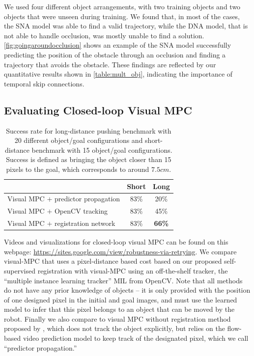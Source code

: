 We used four different object arrangements, with two training objects and two objects that were unseen during training. We found that, in most of the cases, the SNA model was able to find a valid trajectory, while the DNA model, that is not able to handle occlusion, was mostly unable to find a solution. \autoref{fig:goingaroundocclusion} shows an example of the SNA model successfully predicting the position of the obstacle through an occlusion and finding a trajectory that avoids the obstacle. These findings are reflected by our quantitative results shown in \autoref{table:mult_obj}, indicating the importance of temporal skip connections.

\subsection{Evaluating Closed-loop Visual MPC}

\begin{table}
	{\footnotesize
		\begin{center}
			\begin{tabular}{lcc}
				\toprule
				& Short & Long \\
				\midrule
				Visual MPC $+$ predictor propagation  & 83\% & 20\% \\
				Visual MPC $+$ OpenCV tracking  & 83\%  & 45\% \\
				Visual MPC $+$ registration network & 83\% & \textbf{66\%}  \\
				\bottomrule
			\end{tabular}
		\end{center}
	}
	\caption{\small Success rate for long-distance pushing benchmark with 20 different object/goal configurations and short-distance benchmark with 15 object/goal configurations. Success is defined as bringing the object closer than 15 pixels to the goal, which corresponds to around $7.5cm$.}
	\label{table:res_long_short}
\end{table}

Videos and visualizations for closed-loop visual MPC can be found on this webpage: \url{https://sites.google.com/view/robustness-via-retrying}. We compare visual-MPC that uses a pixel-distance based cost based on our proposed self-supervised registration with visual-MPC using an off-the-shelf tracker, the ``multiple instance learning tracker'' MIL \cite{babenko2009visual} from OpenCV. Note that all methods do not have any prior knowledge of objects -- it is only provided with the position of one designed pixel in the initial and goal images, and must use the learned model to infer that this pixel belongs to an object that can be moved by the robot. Finally we also compare to visual MPC without registration method proposed by \cite{sna}, which does not track the object explicitly, but relies on the flow-based video prediction model to keep track of the designated pixel, which we call ``predictor propagation.'' 

